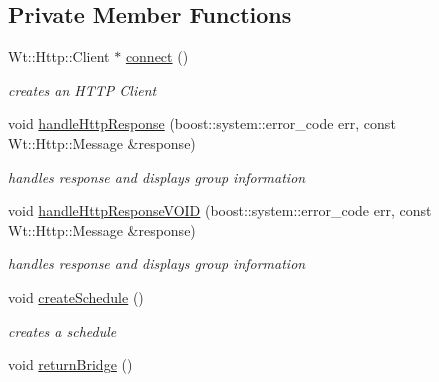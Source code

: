 \subsection*{Private Member Functions}
\begin{DoxyCompactItemize}
\item 
Wt\+::\+Http\+::\+Client $\ast$ \hyperlink{classSchedulerControlWidget_ace95dce867b19128d2ac1d9b7f6af2df}{connect} ()
\begin{DoxyCompactList}\small\item\em creates an H\+T\+TP Client \end{DoxyCompactList}\item 
void \hyperlink{classSchedulerControlWidget_a9b2cb5e76ca840104928a5016741cd4c}{handle\+Http\+Response} (boost\+::system\+::error\+\_\+code err, const Wt\+::\+Http\+::\+Message \&response)
\begin{DoxyCompactList}\small\item\em handles response and displays group information \end{DoxyCompactList}\item 
void \hyperlink{classSchedulerControlWidget_a608cf1aa0348a5a9db24b199136beff6}{handle\+Http\+Response\+V\+O\+ID} (boost\+::system\+::error\+\_\+code err, const Wt\+::\+Http\+::\+Message \&response)
\begin{DoxyCompactList}\small\item\em handles response and displays group information \end{DoxyCompactList}\item 
void \hyperlink{classSchedulerControlWidget_afbf344c96240de973c3f4bdc2f49c23c}{create\+Schedule} ()
\begin{DoxyCompactList}\small\item\em creates a schedule \end{DoxyCompactList}\item 
void \hyperlink{classSchedulerControlWidget_a3f4447117c1338a01e90c582f2666713}{return\+Bridge} ()
\end{DoxyCompactItemize}
